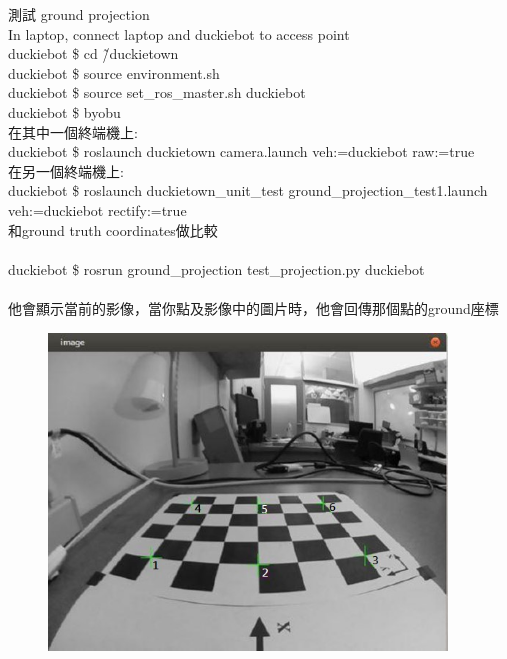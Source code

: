 \documentclass{article}
\begin{document}
測試 ground projection
\\In laptop, connect laptop and duckiebot to access point
\\duckiebot \$ cd \~/duckietown
\\duckiebot \$ source environment.sh
\\duckiebot \$ source set\_ros\_master.sh duckiebot
\\duckiebot \$ byobu
\\在其中一個終端機上:
\\duckiebot \$ roslaunch duckietown camera.launch veh:=duckiebot raw:=true
\\在另一個終端機上:
\\duckiebot \$ roslaunch duckietown\_unit\_test ground\_projection\_test1.launch veh:=duckiebot  rectify:=true
\\和ground truth coordinates做比較
\\
\\duckiebot \$ rosrun ground\_projection test\_projection.py duckiebot
\\
\\他會顯示當前的影像，當你點及影像中的圖片時，他會回傳那個點的ground座標
\\
\begin{figure}[htp]
    \begin{center}
        \includegraphics[width=300pt]{pic/圖片21.jpg}
    \end{center}
\end{figure}
\end{document}
